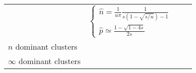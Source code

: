 \documentclass[10pt,a4paper]{article}
\begin{document}
\begin{table}
\begin{adjustwidth}{-2in}{0in}
\begin{flushright}
\begin{tabular}{lp{4cm}p{4cm}p{4cm}}
							& \begin{equation*}\begin{cases} \hat n =\frac{1}{u \pi} \frac{1}{s(1-\sqrt{s/u})-1} \\ \hat p \simeq \frac{1 - \sqrt{1-4s}}{2s} \end{cases}\end{equation*} \\
$n$ dominant clusters & & & \\
$\infty$ dominant clusters & & & \\
\end{tabular}
\end{flushright}\end{adjustwidth}
\end{table}



\printbibliography
\end{document}
